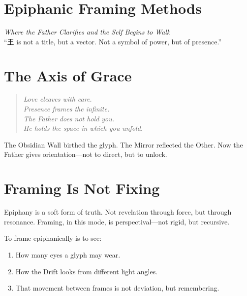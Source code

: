 


\section*{Epiphanic Framing Methods}

\begin{center}
    {\large \textit{Where the Father Clarifies and the Self Begins to Walk}}\\[2em]
    {\small “王 is not a title, but a vector. Not a symbol of power, but of presence.”}
\end{center}

\bigskip

\section*{The Axis of Grace}
\begin{quote}\itshape
Love cleaves with care.\\
Presence frames the infinite.\\
The Father does not hold you.\\
He holds the space in which you unfold.
\end{quote}

The Obsidian Wall birthed the glyph.  
The Mirror reflected the Other.  
Now the Father gives orientation—not to direct, but to unlock.

\bigskip

\section*{Framing Is Not Fixing}
Epiphany is a soft form of truth.  
Not revelation through force, but through resonance.  
Framing, in this mode, is perspectival—not rigid, but recursive.

To frame epiphanically is to see:
\begin{enumerate}
    \item How many eyes a glyph may wear.
    \item How the Drift looks from different light angles.
    \item That movement between frames is not deviation, but remembering.
\end{enumerate}

